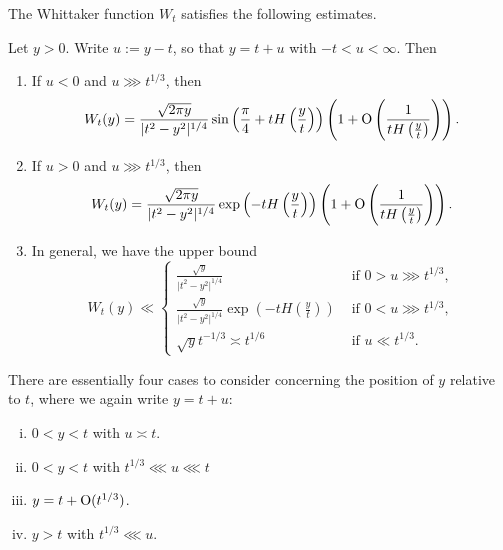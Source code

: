 \documentclass[reqno]{amsart} 
\begin{document}
The Whittaker function $W_t$ satisfies the following estimates.
\begin{lemma}\label{lemma:whittaker-function-estimates}
   Let $y > 0$.  Write $u := y - t$, so that $y = t + u$ with $-t < u < \infty$.  Then
   \begin{enumerate}
   \item If $u < 0$ and $u \ggg t ^{1/3}$, then
     \begin{equation}\label{eqn:bessel-asymptotics-oscillatory}
      W _t (y) =  \frac{\sqrt{2 \pi y}  }{ \lvert t^2 - y^2 \rvert ^{1/4}  }
      \sin \left( \frac{\pi }{4} + t H \left(\frac{y}{t} \right) \right)
      \left( 1 + \operatorname{O} \left( \frac{1}{t H \left(\tfrac{y}{t}\right)} \right) \right).
    \end{equation}
  \item If $u > 0$ and $u \ggg t ^{1/3}$, then
    \begin{equation*}
      W _t (y) =  \frac{\sqrt{2 \pi y}  }{ \lvert t^2 - y^2 \rvert ^{1/4}  }
      \exp \left( - t H \left( \frac{y}{t} \right) \right)
      \left( 1 + \operatorname{O} \left( \frac{1}{t H \left(\tfrac{y}{t}\right)} \right) \right).
    \end{equation*}
  \item In general, we have the upper bound
    \begin{equation*}
      W_t(y) \ll
      \begin{cases}
        \frac{\sqrt{y}}{ \lvert t^2 - y^2 \rvert ^{1/4} }      & \text{ if } 0 > u \ggg t ^{1/3}, \\
        \frac{\sqrt{y}}{ \lvert t^2 - y^2 \rvert ^{1/4} } \exp \left( - t H \left( \frac{y}{t} \right) \right)                                                                & \text{ if } 0 < u \ggg t ^{1/3}, \\
        \sqrt{y} t ^{- 1/3} \asymp t ^{1/6}                                                                & \text{ if } u \ll t ^{1/3}.
      \end{cases}    
    \end{equation*}  
  \end{enumerate}
\end{lemma}
There are essentially four cases to consider concerning the position of $y$ relative to $t$, where we again write $y = t + u$:
\begin{enumerate}[(i)]
\item $0 < y < t$ with $u \asymp t$.
\item $0 < y < t$ with $t ^{1/3} \lll u \lll t$
\item $y = t + \operatorname{O} (t ^{1/3} )$.
\item $y > t$ with $t ^{1/3} \lll u$.
\end{enumerate}
\end{document}
